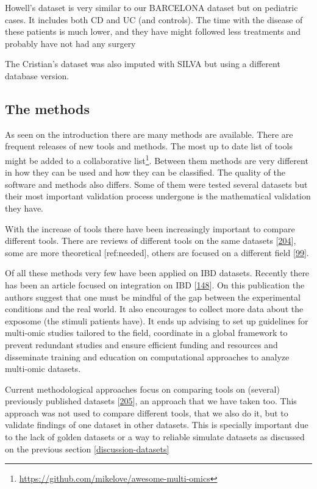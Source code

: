 \documentclass[
  a4paper,
]{book}
\DeclareRobustCommand{\href}[2]{#2\footnote{\url{#1}}}
\begin{document}
Howell's dataset is very similar to our BARCELONA dataset but on pediatric cases.
It includes both CD and UC (and controls).
The time with the disease of these patients is much lower, and they have might followed less treatments and probably have not had any surgery

The Cristian's dataset was also imputed with SILVA but using a different database version.

\hypertarget{the-methods}{%
\subsection{The methods}\label{the-methods}}

As seen on the introduction there are many methods are available.
There are frequent releases of new tools and methods.
The most up to date list of tools might be added to a \href{https://github.com/mikelove/awesome-multi-omics}{collaborative list}.
Between them methods are very different in how they can be used and how they can be classified.
The quality of the software and methods also differs.
Some of them were tested several datasets but their most important validation process undergone is the mathematical validation they have.

With the increase of tools there have been increasingly important to compare different tools.
There are reviews of different tools on the same datasets {[}\protect\hyperlink{ref-cantini2020}{204}{]}, some are more theoretical {[}ref:needed{]}, others are focused on a different field {[}\protect\hyperlink{ref-cavill2016}{99}{]}.

Of all these methods very few have been applied on IBD datasets.
Recently there has been an article focused on integration on IBD {[}\protect\hyperlink{ref-sudhakar2022}{148}{]}.
On this publication the authors suggest that one must be mindful of the gap between the experimental conditions and the real world.
It also encourages to collect more data about the exposome (the stimuli patients have).
It ends up advising to set up guidelines for multi-omic studies tailored to the field, coordinate in a global framework to prevent redundant studies and ensure efficient funding and resources and disseminate training and education on computational approaches to analyze multi-omic datasets.

Current methodological approaches focus on comparing tools on (several) previously published datasets {[}\protect\hyperlink{ref-cantini2021}{205}{]}, an approach that we have taken too.
This approach was not used to compare different tools, that we also do it, but to validate findings of one dataset in other datasets.
This is specially important due to the lack of golden datasets or a way to reliable simulate datasets as discussed on the previous section \ref{discussion-datasets}
\end{document}
